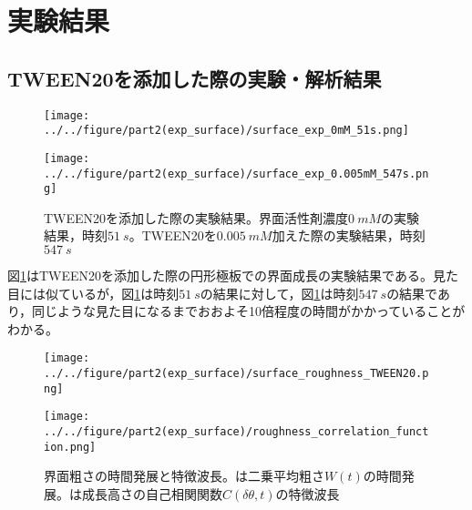 \documentclass[autodetect-engine,dvi=dvipdfmx,a4paper,ja=standard,oneside,openany,11pt]{bxjsbook}
\begin{document}
\section{実験結果}
\subsection{TWEEN20を添加した際の実験・解析結果}
\begin{figure}[htbp]
  \begin{minipage}
    {0.5\textwidth}
    \subcaption{}
    \centering
    \texttt{[image: ../../figure/part2(exp\_surface)/surface\_exp\_0mM\_51s.png]}
    \label{fig:surface_exp_0mM_51s}
  \end{minipage}
  \begin{minipage}
    {0.5\textwidth}
    \subcaption{}
    \centering
    \texttt{[image: ../../figure/part2(exp\_surface)/surface\_exp\_0.005mM\_547s.png]}
    \label{fig:surface_exp_0.005mM_547s}
  \end{minipage}
  \caption{TWEEN20を添加した際の実験結果。界面活性剤濃度$\SI{0}{mM}$の実験結果，時刻$\SI{51}{s}$。TWEEN20を$\SI{0.005}{mM}$加えた際の実験結果，時刻$\SI{547}{s}$}
  \label{fig:surface_exp}
\end{figure}
図\ref{fig:surface_exp}はTWEEN20を添加した際の円形極板での界面成長の実験結果である。見た目には似ているが，図\ref{fig:surface_exp}は時刻$\SI{51}{s}$の結果に対して，図\ref{fig:surface_exp}は時刻$\SI{547}{s}$の結果であり，同じような見た目になるまでおおよそ10倍程度の時間がかかっていることがわかる。

\begin{figure}[htbp]
  \begin{minipage}{0.43\textwidth}
    \subcaption{}
    \centering
    \texttt{[image: ../../figure/part2(exp\_surface)/surface\_roughness\_TWEEN20.png]}
    \label{fig:surface_roughness_TWEEN20}
  \end{minipage}
  \begin{minipage}{0.55\textwidth}
    \subcaption{}
    \centering
    \texttt{[image: ../../figure/part2(exp\_surface)/roughness\_correlation\_function.png]}
    \label{fig:roughness_correlation_function}
  \end{minipage}
  \caption{界面粗さの時間発展と特徴波長。は二乗平均粗さ$W(t)$の時間発展。は成長高さの自己相関関数$C(\delta\theta,t)$の特徴波長}
  \label{fig:surface_roughness}
\end{figure}
\end{document}
